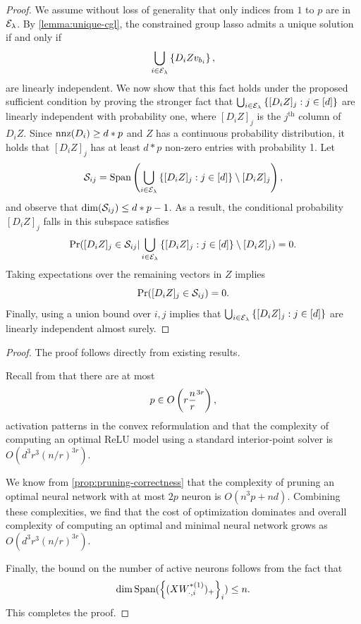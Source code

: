\reluUnique*
\begin{proof}
    We assume without loss of generality that only indices from \( 1 \)
    to \( p \) are in \( {\mathcal{E}_{\lambda}} \).
    By \cref{lemma:unique-cgl}, the constrained group lasso
    admits a unique solution
    if and only if
    \[
        \bigcup_{i \in {\mathcal{E}_{\lambda}}} \left\{D_i Z v_{b_i}\right\},
    \]
    are linearly independent.
    We now show that this fact holds under the proposed sufficient condition
    by proving the stronger fact that
    \( \bigcup_{i \in {\mathcal{E}_{\lambda}}} \left\{[D_i Z]_j : j \in [d]\right\} \)
    are linearly independent with probability one, where
    \( [D_i Z]_j \) is the \( j^{\text{th}} \)
    column of \( D_i Z \).
    Since \( \text{nnz}(D_i) \geq d * p \) and \( Z \) has a continuous
    probability distribution, it holds that
    \( [D_i Z]_j \) has at least
    \( d * p \) non-zero entries with probability 1.
    Let
    \[
        \mathcal{S}_{ij}
        = \text{Span}\left(\bigcup_{i \in {\mathcal{E}_{\lambda}}} \left\{[D_i Z]_j : j \in [d]\right\}
            \setminus [D_i Z]_j\right),
    \]
    and observe that \( \text{dim}(\mathcal{S}_{ij}) \leq d * p - 1 \).
    As a result, the conditional probability \( [D_i Z]_j \) falls
    in this subspace satisfies
    \[
        \Pr([D_i Z]_j \in \mathcal{S}_{ij} | \bigcup_{i \in {\mathcal{E}_{\lambda}}} \left\{[D_i Z]_j : j \in [d]\right\}
        \setminus [D_i Z]_j) = 0.
    \]
    Taking expectations over the remaining vectors in \( Z \) implies
    \[
        \Pr([D_i Z]_j \in \mathcal{S}_{ij}) = 0.
    \]
    Finally, using a union bound over \( i, j \) implies that
    \( \bigcup_{i \in {\mathcal{E}_{\lambda}}} \left\{[D_i Z]_j : j \in [d]\right\} \) are linearly independent
    almost surely.
\end{proof}

\minimalComplexity*
\begin{proof}
    The proof follows directly from existing results.

    Recall from \citet{pilanci2020convexnn} that there are at most
    \[
        p \in O\left(r \frac{n}{r}^{3r}\right),
    \]
    activation patterns in the convex reformulation and that the complexity
    of computing an optimal ReLU model using a standard interior-point solver
    is \( O(d^3 r^3 (n / r)^{3r}) \).

    We know from \cref{prop:pruning-correctness} that the complexity of
    pruning an optimal neural network with at most \( 2p \) neuron
    is \( O(n^3 p + nd) \).
    Combining these complexities, we find that the cost of optimization dominates
    and overall complexity of computing an optimal and minimal neural network
    grows as \( O(d^3 r^3 (n / r)^{3r}) \).

    Finally, the bound on the number of active neurons follows from the
    fact that
    \[
        \dim \text{Span}(\left\{(X W^{*(1)}_{\cdot, i})_+\right\}_i) \leq n.
    \]
    This completes the proof.
\end{proof}


